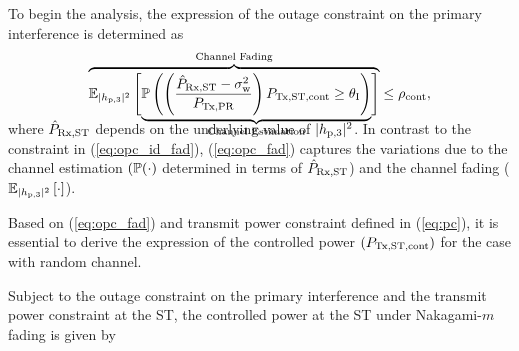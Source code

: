{To begin the analysis, the expression of the outage constraint on the primary interference is determined as 
\begin{align}
\smash[b]{\overbrace{{\mathbb E}_{|h_{\text{p,3}}|^2}\left[ \smash[b]{\underbrace{\mathbb P\left( \left( \frac{\hat{P}_{\text{Rx,ST}} - \sigma^2_{\text{w}}}{P_{\text{Tx,PR}}}\right) P_{\text{Tx,ST,cont}} \ge \theta_{\text{I}} \right)}_{\text{Channel Estimation}}} \right]}^{\text{Channel Fading}}} \le \rho_{\text{cont}}, \label{eq:opc_fad} \\[0.5em] 
\end{align}
where $\hat{P}_{\text{Rx,ST}}$ depends on the underlying value of $|h_{\text{p,3}}|^2$. In contrast to the constraint in (\ref{eq:opc_id_fad}), (\ref{eq:opc_fad}) captures the variations due to the channel estimation $(\mathbb P(\cdot)$ determined in terms of $\hat{P}_{\text{Rx,ST}}$) and the channel fading (${\mathbb E}_{|h_{\text{p,3}}|^2}\left[ \cdot \right]$). 

Based on (\ref{eq:opc_fad}) and transmit power constraint defined in (\ref{eq:pc}), it is essential to derive the expression of the controlled power $(P_{\text{Tx,ST,cont}})$ for the case with random channel.

\begin{lemma} \label{lm:lm6}
\normalfont
Subject to the outage constraint on the primary interference and the transmit power constraint at the ST, the controlled power at the ST under Nakagami-$m$ fading is given by %


\end{lemma}}
